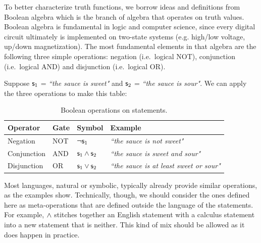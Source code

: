 \documentclass[11pt,letterpaper,fleqn]{memoir} %
\begin{document}
To better characterize truth functions, we borrow ideas and definitions from Boolean algebra which is the branch of algebra that operates on truth values. Boolean algebra is fundamental in logic and computer science, since every digital circuit ultimately is implemented on two-state systems (e.g. high/low voltage, up/down magnetization).  The most fundamental elements in that algebra are the following three simple operations: negation (i.e.~logical NOT), conjunction (i.e.~logical AND) and disjunction (i.e.~logical OR).

Suppose $\mathsf{s}_1$ = \emph{``the sauce is sweet"} and $\mathsf{s}_2$ = \emph{``the sauce is sour"}. We can apply the three operations to make this table:

\begin{table}[h]
	\centering
	\begin{tabular}{p{} p{} p{} p{}}
		Operator & Gate & Symbol & Example \\ 
		\hline 
		Negation & NOT & $\neg \mathsf{s}_1$ &  \emph{``the sauce is not sweet"} \\ 
		Conjunction & AND & $\mathsf{s}_1 \wedge \mathsf{s}_2$ & \emph{``the sauce is sweet and sour"} \\ 
		Disjunction & OR & $\mathsf{s}_1 \vee \mathsf{s}_2$ & \emph{``the sauce is at least sweet or sour"}
	\end{tabular} 
	\caption{Boolean operations on statements.}
\end{table}

Most languages, natural or symbolic, typically already provide similar operations, as the examples show. Technically, though, we should consider the ones defined here as meta-operations that are defined outside the language of the statements. For example, $\wedge$ stitches together an English statement with a calculus statement into a new statement that is neither. This kind of mix should be allowed as it does happen in practice.
\end{document}

